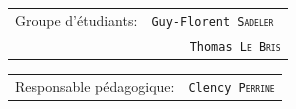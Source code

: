 \begin{titlepage}
\vspace*{1cm}





\begin{center}
\begin{tabular}{l r}

Groupe d'étudiants: & \texttt{Guy-Florent \textsc{Sadeler} }\\ %
&  \texttt{Thomas \textsc{Le Bris}}

\end{tabular}
\end{center}

\vspace*{1cm}
\begin{center}
\begin{tabular}{l r}
Responsable pédagogique: & \texttt{Clency \textsc{Perrine}} %
\end{tabular}
\end{center}




\end{titlepage}